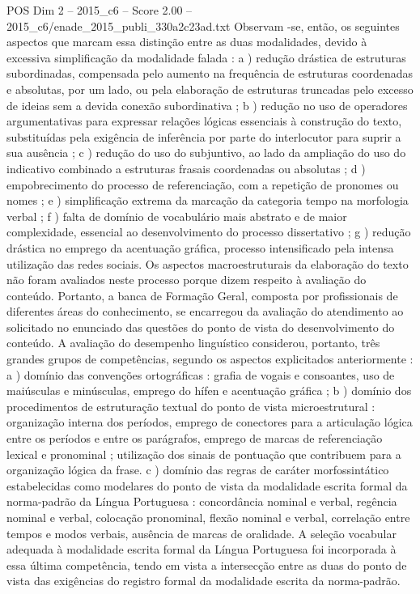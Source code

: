\begin{textsample}{POS Dim 2 – 2015\_c6 – Score 2.00 – 2015\_c6/enade\_2015\_publi\_330a2c23ad.txt}
Observam -se, então, os seguintes aspectos que marcam essa distinção entre as duas modalidades, devido à excessiva simplificação da modalidade falada : a ) redução drástica de estruturas subordinadas, compensada pelo aumento na frequência de estruturas coordenadas e absolutas, por um lado, ou pela elaboração de estruturas truncadas pelo excesso de ideias sem a devida conexão subordinativa ; b ) redução no uso de operadores argumentativas para expressar relações lógicas essenciais à construção do texto, substituídas pela exigência de inferência por parte do interlocutor para suprir a sua ausência ; c ) redução do uso do subjuntivo, ao lado da ampliação do uso do indicativo combinado a estruturas frasais coordenadas ou absolutas ; d ) empobrecimento do processo de referenciação, com a repetição de pronomes ou nomes ; e ) simplificação extrema da marcação da categoria tempo na morfologia verbal ; f ) falta de domínio de vocabulário mais abstrato e de maior complexidade, essencial ao desenvolvimento do processo dissertativo ; g ) redução drástica no emprego da acentuação gráfica, processo intensificado pela intensa utilização das redes sociais.
Os aspectos macroestruturais da elaboração do texto não foram avaliados neste processo porque dizem respeito à avaliação do conteúdo.
Portanto, a banca de Formação Geral, composta por profissionais de diferentes áreas do conhecimento, se encarregou da avaliação do atendimento ao solicitado no enunciado das questões do ponto de vista do desenvolvimento do conteúdo.
A avaliação do desempenho linguístico considerou, portanto, três grandes grupos de competências, segundo os aspectos explicitados anteriormente : a ) domínio das convenções ortográficas : grafia de vogais e consoantes, uso de maiúsculas e minúsculas, emprego do hífen e acentuação gráfica ; b ) domínio dos procedimentos de estruturação textual do ponto de vista microestrutural : organização interna dos períodos, emprego de conectores para a articulação lógica entre os períodos e entre os parágrafos, emprego de marcas de referenciação lexical e pronominal ; utilização dos sinais de pontuação que contribuem para a organização lógica da frase. c ) domínio das regras de caráter morfossintático estabelecidas como modelares do ponto de vista da modalidade escrita formal da norma-padrão da Língua Portuguesa : concordância nominal e verbal, regência nominal e verbal, colocação pronominal, flexão nominal e verbal, correlação entre tempos e modos verbais, ausência de marcas de oralidade.
A seleção vocabular adequada à modalidade escrita formal da Língua Portuguesa foi incorporada à essa última competência, tendo em vista a intersecção entre as duas do ponto de vista das exigências do registro formal da modalidade escrita da norma-padrão.

\end{textsample}

